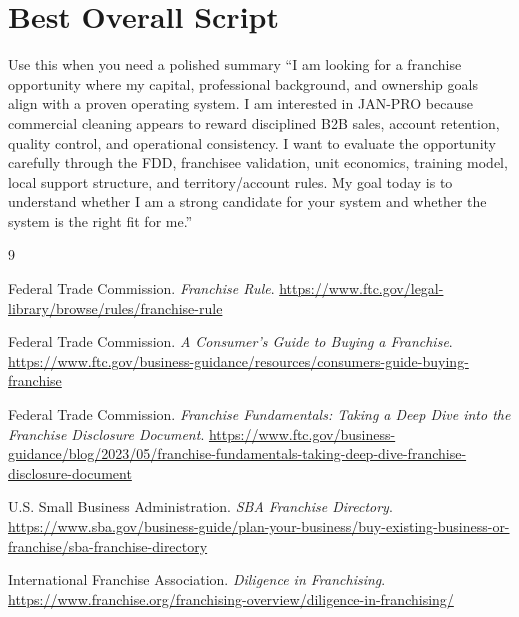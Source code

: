 \documentclass[11pt]{article}
\newcommand{\janpro}{JAN-PRO}
\begin{document}
\section{Best Overall Script}

\begin{greenbox}{Use this when you need a polished summary}
``I am looking for a franchise opportunity where my capital, professional background, and ownership goals align with a proven operating system. I am interested in \janpro{} because commercial cleaning appears to reward disciplined B2B sales, account retention, quality control, and operational consistency. I want to evaluate the opportunity carefully through the FDD, franchisee validation, unit economics, training model, local support structure, and territory/account rules. My goal today is to understand whether I am a strong candidate for your system and whether the system is the right fit for me.''
\end{greenbox}

\renewcommand{\refname}{\color{accent}References}
\begin{thebibliography}{9}

Federal Trade Commission.
\textit{Franchise Rule}.
\url{https://www.ftc.gov/legal-library/browse/rules/franchise-rule}

Federal Trade Commission.
\textit{A Consumer's Guide to Buying a Franchise}.
\url{https://www.ftc.gov/business-guidance/resources/consumers-guide-buying-franchise}

Federal Trade Commission.
\textit{Franchise Fundamentals: Taking a Deep Dive into the Franchise Disclosure Document}.
\url{https://www.ftc.gov/business-guidance/blog/2023/05/franchise-fundamentals-taking-deep-dive-franchise-disclosure-document}

U.S. Small Business Administration.
\textit{SBA Franchise Directory}.
\url{https://www.sba.gov/business-guide/plan-your-business/buy-existing-business-or-franchise/sba-franchise-directory}

International Franchise Association.
\textit{Diligence in Franchising}.
\url{https://www.franchise.org/franchising-overview/diligence-in-franchising/}

\end{thebibliography}
\end{document}
